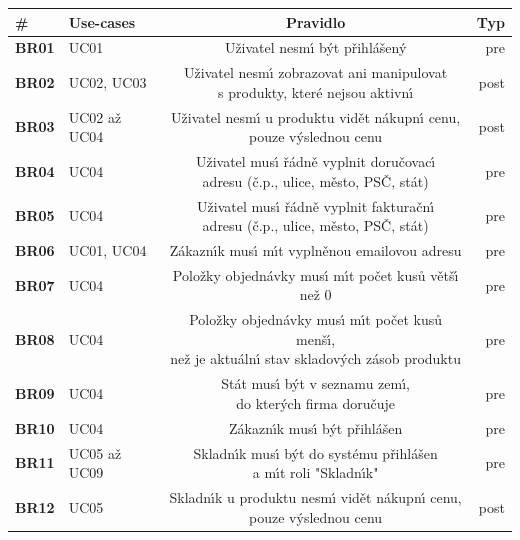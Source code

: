 \begin{table}
    \centering
    \begin{tabular}{ l l c r }
        \hline
        \textbf{\#} & \textbf{Use-cases} & \textbf{Pravidlo} & \textbf{Typ} \\ \hline \hline
        \textbf{BR01} & UC01 & Uživatel nesm\'{\i} b\'yt přihlášen\'y & pre \\ \hline
        \textbf{BR02} & UC02, UC03 & \makecell[c]{Uživatel nesm\'{\i} zobrazovat ani manipulovat \\ s produkty, které nejsou aktivn\'{\i}} & post \\ \hline
        \textbf{BR03} & UC02 až UC04 & \makecell[c]{Uživatel nesm\'{\i} u produktu vidět nákupn\'{\i} cenu, \\ pouze v\'yslednou cenu} & post \\ \hline
        \textbf{BR04} & UC04 & \makecell[c]{Uživatel mus\'{\i} řádně vyplnit doručovac\'{\i} \\ adresu (č.p., ulice, město, PSČ, stát)} & pre \\ \hline
        \textbf{BR05} & UC04 & \makecell[c]{Uživatel mus\'{\i} řádně vyplnit fakturačn\'{\i} \\ adresu (č.p., ulice, město, PSČ, stát)} & pre \\ \hline
        \textbf{BR06} & UC01, UC04 & Zákazn\'{\i}k mus\'{\i} m\'{\i}t vyplněnou emailovou adresu & pre \\ \hline
        \textbf{BR07} & UC04 & Položky objednávky mus\'{\i} m\'{\i}t počet kusů větš\'{\i} než 0 & pre \\ \hline
        \textbf{BR08} & UC04 & \makecell[c]{Položky objednávky mus\'{\i} m\'{\i}t počet kusů menš\'{\i}, \\ než je aktuáln\'{\i} stav skladov\'ych zásob produktu} & pre \\ \hline
        \textbf{BR09} & UC04 & \makecell[c]{Stát mus\'{\i} b\'yt v seznamu zem\'{\i}, \\ do kter\'ych firma doručuje} & pre \\ \hline
        \textbf{BR10} & UC04 & Zákazn\'{\i}k mus\'{\i} b\'yt přihlášen & pre \\ \hline
        \textbf{BR11} & UC05 až UC09 & \makecell[c]{Skladn\'{\i}k mus\'{\i} b\'yt do systému přihlášen \\ a m\'{\i}t roli "Skladn\'{\i}k"} & pre \\ \hline
        \textbf{BR12} & UC05 & \makecell[c]{Skladn\'{\i}k u produktu nesm\'{\i} vidět nákupn\'{\i} cenu, \\ pouze v\'yslednou cenu} & post \\ \hline

\end{tabular}
\end{table}
